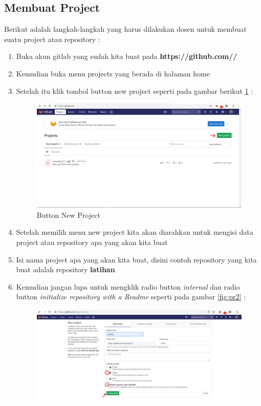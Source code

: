 \subsection{Membuat Project}
Berikut adalah langkah-langkah yang harus dilakukan dosen untuk membuat suatu project atau repository :
\begin{enumerate}
\item Buka akun gitlab yang sudah kita buat pada \textbf{https://github.com//}
\item Kemudian buka menu projects yang berada di halaman home
\item Setelah itu klik tombol button new project seperti pada gambar berikut \ref{fig:pr1} :
\subitem 
\begin{figure}[!htbp]
\centerline{\includegraphics[width=.75\textwidth]{Figures/gitlab/pr1.JPG}}
\caption{Button New Project}
\label{fig:pr1}
\end{figure}
\item Setelah memilih menu new project kita akan diarahkan untuk mengisi data project atau repository apa yang akan kita buat
\item Isi nama project apa yang akan kita buat, disini contoh repository yang kita buat adalah repository \textbf{latihan}
\item Kemudian jangan lupa untuk mengklik radio button \textit{internal} dan radio button \textit{initialize repository with a Readme} seperti pada gambar \ref{fig:pr2} :
\subitem
\begin{figure}[!htbp]
\centerline{\includegraphics[width=.75\textwidth]{Figures/gitlab/pr2.JPG}}

\end{figure}
\end{enumerate}
